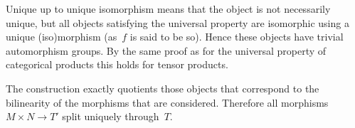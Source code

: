 \begin{exercise}
  Unique up to unique isomorphism means that the object is not necessarily unique, but all objects satisfying the universal property are isomorphic using a unique (iso)morphism (as~$f$ is said to be so). Hence these objects have trivial automorphism groups. By the same proof as for the universal property of categorical products this holds for tensor products.
\end{exercise}

\begin{exercise} %
  The construction exactly quotients those objects that correspond to the bilinearity of the morphisms that are considered. Therefore all morphisms~$M\times N\to T'$ split uniquely through~$T$.
\end{exercise}

